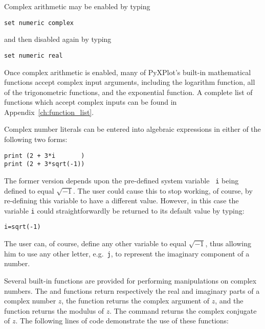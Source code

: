 \vspace{3mm}
\newline
{}
\vspace{3mm}

Complex arithmetic may be enabled by typing

\begin{verbatim}
set numeric complex
\end{verbatim}

\noindent and then disabled again by typing

\begin{verbatim}
set numeric real
\end{verbatim}

\noindent Once complex arithmetic is enabled, many of PyXPlot's built-in
mathematical functions accept complex input arguments, including the logarithm
function, all of the trigonometric functions, and the exponential function.  A
complete list of functions which accept complex inputs can be found in
Appendix~\ref{ch:function_list}.

Complex number literals can be entered into algebraic expressions in either of
the following two forms:

\begin{verbatim}
print (2 + 3*i       )
print (2 + 3*sqrt(-1))
\end{verbatim}

\noindent The former version depends upon the pre-defined system variable {\tt
i} being defined to equal $\sqrt{-1}$. The user could cause this to stop working,
of course, by re-defining this variable to have a different value.  However, in
this case the variable {\tt i} could straightforwardly be returned to its
default value by typing:

\begin{verbatim}
i=sqrt(-1)
\end{verbatim}

\noindent The user can, of course, define any other variable to equal
$\sqrt{-1}$, thus allowing him to use any other letter, e.g.\ {\tt j}, to
represent the imaginary component of a number.

Several built-in functions are provided for performing manipulations on complex
numbers. The  and  functions return respectively
the real and imaginary parts of a complex number $z$, the 
function returns the complex argument of $z$, and the  function
returns the modulus of $z$.  The  command returns the
complex conjugate of $z$. The following lines of code demonstrate the use of
these functions:


